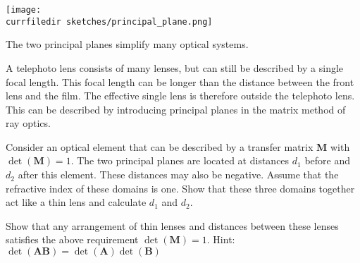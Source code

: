 \begin{marginfigure}
    \texttt{[image: \\currfiledir sketches/principal\_plane.png]}
   \caption{The two principal planes simplify many optical systems.}
\end{marginfigure}

\begin{questions}
\item A telephoto lens consists of many lenses, but can still be described by a single focal length. This focal length can be longer than the distance between the front lens and the film. The effective single lens is therefore outside the telephoto lens. This can be described by introducing principal planes in the matrix method of ray optics.
 
   Consider an optical element that can be described by a transfer matrix $\boldsymbol{M}$ with $\det(\boldsymbol{M}) = 1$. The two principal planes are located at distances $d_1$ before and $d_2$ after this element. These distances may also be negative. Assume that the refractive index of these domains is one. Show that these three domains together act like a thin lens and calculate $d_1$ and $d_2$.

\item  Show that any arrangement of thin lenses and distances between these lenses satisfies the above requirement $\det(\boldsymbol{M}) = 1$. \newline Hint: $\det(\boldsymbol{A} \boldsymbol{B} )  = \det(\boldsymbol{A})  \det(\boldsymbol{B}) $
\end{questions}


